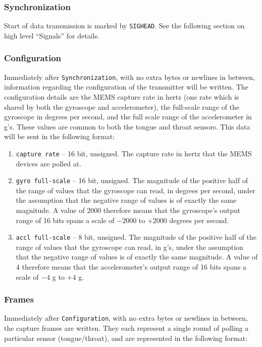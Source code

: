 \documentclass{article}
\begin{document}
        \subsubsection{Synchronization}
        Start of data transmission is marked by \texttt{SIG\textunderscore HEAD}. See the following section on high level ``Signals'' for details.
        
        \subsubsection{Configuration}
        Immediately after \texttt{Synchronization}, with no extra bytes or newlines in between, information regarding the configuration of the transmitter will be written. The configuration details are the MEMS capture rate in hertz (one rate which is shared by both the gyroscope and accelerometer), the full-scale range of the gyroscope in degrees per second, and the full scale range of the accelerometer in g's. These values are common to both the tongue and throat sensors. This data will be sent in the following format:
        
            \begin{enumerate}
                \item \texttt{capture rate} -- 16 bit, unsigned. The capture rate in hertz that the MEMS devices are polled at.
                \item \texttt{gyro full-scale} -- 16 bit, unsigned. The magnitude of the positive half of the range of values that the gyroscope can read, in degrees per second, under the assumption that the negative range of values is of exactly the same magnitude. A value of 2000 therefore means that the gyroscope's output range of 16 bits spans a scale of $-2000$ to $+2000$ degrees per second.
                \item \texttt{accl full-scale} -- 8 bit, unsigned. The magnitude of the positive half of the range of values that the gyroscope can read, in g's, under the assumption that the negative range of values is of exactly the same magnitude. A value of 4 therefore means that the accelerometer's output range of 16 bits spans a scale of $-4$ g to $+4$ g.
            \end{enumerate}
        
        \subsubsection{Frames}
        Immediately after \texttt{Configuration}, with no extra bytes or newlines in between, the capture frames are written. They each represent a single round of polling a particular sensor (tongue/throat), and are represented in the following format:
        
\end{document}
